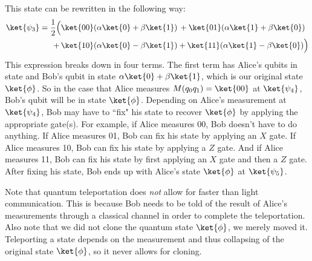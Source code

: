 \documentclass[11pt, notitlepage]{report}
\begin{document}
This state can be rewritten in the following way:
\begin{align*}
  \ket{\psi_3} = \dfrac{1}{2}\Big(&\ket{00}(\alpha\ket{0} + \beta{\ket{1}}) \, + \ket{01}(\alpha\ket{1} + \beta\ket{0}) \\
  + \, &\ket{10}(\alpha\ket{0} - \beta\ket{1}) + \ket{11}(\alpha\ket{1} - \beta\ket{0})\Big)
\end{align*}
This expression breaks down in four terms. The first term has Alice's qubits in state  and Bob's qubit in state $\alpha\ket{0} + \beta\ket{1}$, which is our original state $\ket{\phi}$. So in the case that Alice measures $M(q_0q_1) = \ket{00}$ at $\ket{\psi_4}$, Bob's qubit will be in state $\ket{\phi}$. Depending on Alice's measurement at $\ket{\psi_4}$, Bob may have to ``fix" his state to recover $\ket{\phi}$ by applying the appropriate gate(s). For example, if Alice measures 00, Bob doesn't have to do anything. If Alice measures 01, Bob can fix his state by applying an $X$ gate. If Alice measures 10, Bob can fix his state by applying a $Z$ gate. And if Alice measures 11, Bob can fix his state by first applying an $X$ gate and then a $Z$ gate. After fixing his state, Bob ends up with Alice's state $\ket{\phi}$ at $\ket{\psi_5}$.

Note that quantum teleportation does \emph{not} allow for faster than light communication. This is because Bob needs to be told of the result of Alice's measurements through a classical channel in order to complete the teleportation. Also note that we did not clone the quantum state $\ket{\phi}$, we merely moved it. Teleporting a state depends on the measurement and thus collapsing of the original state $\ket{\phi}$, so it never allows for cloning.
\end{document}
